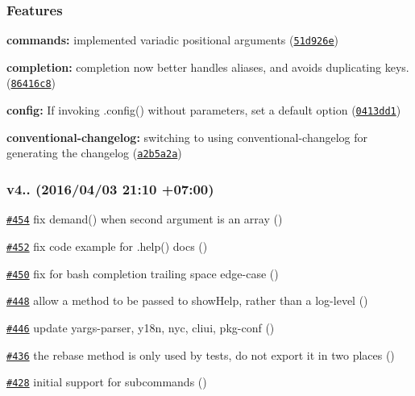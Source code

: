 \subsubsection*{Features}


\begin{DoxyItemize}
\item {\bfseries commands\+:} implemented variadic positional arguments (\href{https://github.com/yargs/yargs/commit/51d926e}{\tt 51d926e})
\item {\bfseries completion\+:} completion now better handles aliases, and avoids duplicating keys. (\href{https://github.com/yargs/yargs/commit/86416c8}{\tt 86416c8})
\item {\bfseries config\+:} If invoking .config() without parameters, set a default option (\href{https://github.com/yargs/yargs/commit/0413dd1}{\tt 0413dd1})
\item {\bfseries conventional-\/changelog\+:} switching to using conventional-\/changelog for generating the changelog (\href{https://github.com/yargs/yargs/commit/a2b5a2a}{\tt a2b5a2a})
\end{DoxyItemize}

\subsubsection*{v4.. (2016/04/03 21\+:10 +07\+:00)}


\begin{DoxyItemize}
\item \href{https://github.com/yargs/yargs/pull/454}{\tt \#454} fix demand() when second argument is an array ()
\item \href{https://github.com/yargs/yargs/pull/452}{\tt \#452} fix code example for {\ttfamily .help()} docs ()
\item \href{https://github.com/yargs/yargs/pull/450}{\tt \#450} fix for bash completion trailing space edge-\/case ()
\item \href{https://github.com/yargs/yargs/pull/448}{\tt \#448} allow a method to be passed to {\ttfamily show\+Help}, rather than a log-\/level ()
\item \href{https://github.com/yargs/yargs/pull/446}{\tt \#446} update yargs-\/parser, y18n, nyc, cliui, pkg-\/conf ()
\item \href{https://github.com/yargs/yargs/pull/436}{\tt \#436} the rebase method is only used by tests, do not export it in two places ()
\item \href{https://github.com/yargs/yargs/pull/428}{\tt \#428} initial support for subcommands ()
\end{DoxyItemize}

